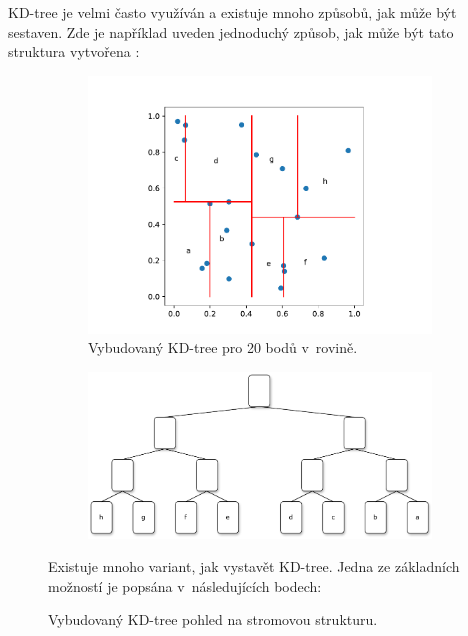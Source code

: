 KD-tree je velmi často využíván a existuje mnoho způsobů, jak může být sestaven. Zde je například uveden jednoduchý způsob, jak může být tato struktura vytvořena \cite{moore1991kdtrees}:

\begin{figure}[b!]
\begin{subfigure}[b]{1\textwidth}
    
    \centering
    \includegraphics[scale=.6]{obrazky-figures/kdtree/kdtree.pdf}
    \caption{Vybudovaný KD-tree pro 20 bodů v~rovině.}

\end{subfigure}

\begin{subfigure}[b]{0.9\textwidth}
    
    \centering
    \includegraphics[scale=0.6]{obrazky-figures/kdtree/kd-tree.drawio.pdf}
\end{subfigure}
    \caption{Vybudovaný KD-tree pohled na stromovou strukturu.}

    \label{fig:kd-tree}

Existuje mnoho variant, jak vystavět KD-tree. Jedna ze základních možností je popsána v~následujících bodech:
\end{figure}
